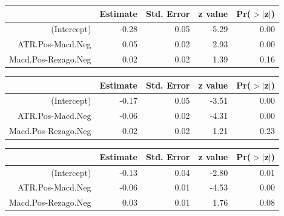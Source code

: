 \documentclass[a4paper,12pt]{Latex/Classes/PhDthesisPSnPDF}
\begin{document}
\begin{center}
\begin{table}[ht]
\centering
\begin{tabular}{rrrrr}
  \hline
 & Estimate & Std. Error & z value & Pr($>$$|$z$|$) \\ 
  \hline
(Intercept) & -0.28 & 0.05 & -5.29 & 0.00 \\ 
  ATR.Pos-Macd.Neg & 0.05 & 0.02 & 2.93 & 0.00 \\ 
  Macd.Pos-Rezago.Neg & 0.02 & 0.02 & 1.39 & 0.16 \\ 
   \hline
\end{tabular}
\end{table}\end{center}

\newpage
\begin{center}
\begin{table}[ht]
\centering
\begin{tabular}{rrrrr}
  \hline
 & Estimate & Std. Error & z value & Pr($>$$|$z$|$) \\ 
  \hline
(Intercept) & -0.17 & 0.05 & -3.51 & 0.00 \\ 
  ATR.Pos-Macd.Neg & -0.06 & 0.02 & -4.31 & 0.00 \\ 
  Macd.Pos-Rezago.Neg & 0.02 & 0.02 & 1.21 & 0.23 \\ 
   \hline
\end{tabular}
\end{table}\end{center}

\begin{center}
\begin{table}[ht]
\centering
\begin{tabular}{rrrrr}
  \hline
 & Estimate & Std. Error & z value & Pr($>$$|$z$|$) \\ 
  \hline
(Intercept) & -0.13 & 0.04 & -2.80 & 0.01 \\ 
  ATR.Pos-Macd.Neg & -0.06 & 0.01 & -4.53 & 0.00 \\ 
  Macd.Pos-Rezago.Neg & 0.03 & 0.01 & 1.76 & 0.08 \\ 
   \hline
\end{tabular}
\end{table}\end{center}
\end{document}
